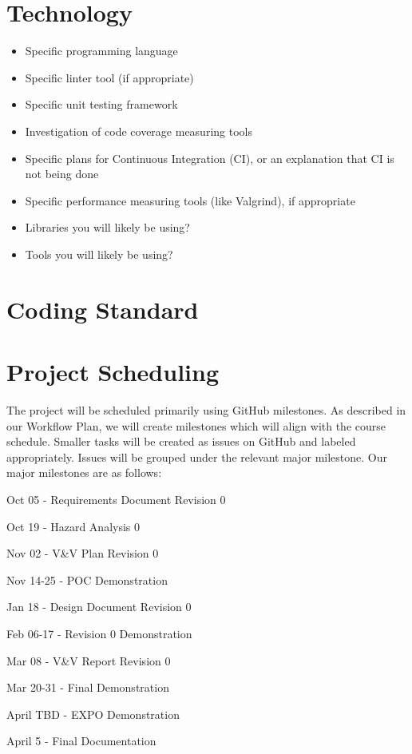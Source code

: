 \documentclass{article}
\begin{document}
\section{Technology}

\begin{itemize}
\item Specific programming language
\item Specific linter tool (if appropriate)
\item Specific unit testing framework
\item Investigation of code coverage measuring tools
\item Specific plans for Continuous Integration (CI), or an explanation that CI
  is not being done
\item Specific performance measuring tools (like Valgrind), if
  appropriate
\item Libraries you will likely be using?
\item Tools you will likely be using?
\end{itemize}

\section{Coding Standard}

\section{Project Scheduling}

\noindent The project will be scheduled primarily using GitHub milestones. As described in our Workflow Plan, we will create milestones which will align with the course schedule. Smaller tasks will be created as issues on GitHub and labeled appropriately. Issues will be grouped under the relevant major milestone. Our major milestones are as follows:

\item Oct 05 - Requirements Document Revision 0
\item Oct 19 - Hazard Analysis 0 
\item Nov 02 - V&V Plan Revision 0
\item Nov 14-25 - POC Demonstration
\item Jan 18 - Design Document Revision 0
\item Feb 06-17 - Revision 0 Demonstration
\item Mar 08 - V&V Report Revision 0
\item Mar 20-31 - Final Demonstration
\item April TBD - EXPO Demonstration
\item April 5 - Final Documentation \\
\end{document}
